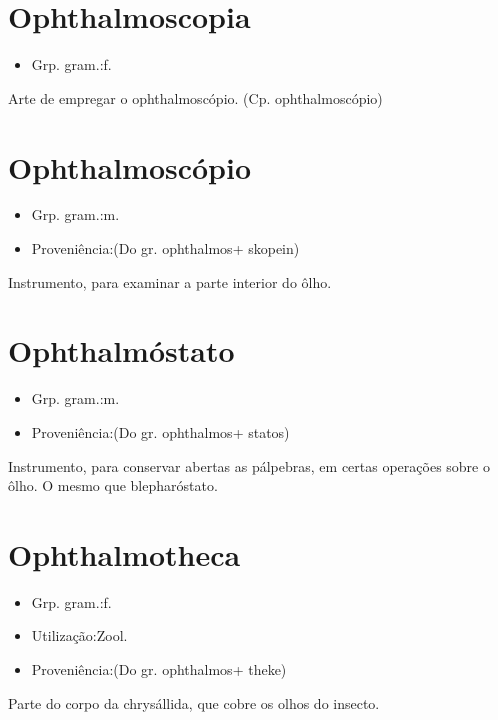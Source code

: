 \section{Ophthalmoscopia}
\begin{itemize}
\item {Grp. gram.:f.}
\end{itemize}
Arte de empregar o ophthalmoscópio.
(Cp. \textunderscore ophthalmoscópio\textunderscore )
\section{Ophthalmoscópio}
\begin{itemize}
\item {Grp. gram.:m.}
\end{itemize}
\begin{itemize}
\item {Proveniência:(Do gr. \textunderscore ophthalmos\textunderscore  + \textunderscore skopein\textunderscore )}
\end{itemize}
Instrumento, para examinar a parte interior do ôlho.
\section{Ophthalmóstato}
\begin{itemize}
\item {Grp. gram.:m.}
\end{itemize}
\begin{itemize}
\item {Proveniência:(Do gr. \textunderscore ophthalmos\textunderscore  + \textunderscore statos\textunderscore )}
\end{itemize}
Instrumento, para conservar abertas as pálpebras, em certas operações sobre o ôlho.
O mesmo que \textunderscore blepharóstato\textunderscore .
\section{Ophthalmotheca}
\begin{itemize}
\item {Grp. gram.:f.}
\end{itemize}
\begin{itemize}
\item {Utilização:Zool.}
\end{itemize}
\begin{itemize}
\item {Proveniência:(Do gr. \textunderscore ophthalmos\textunderscore  + \textunderscore theke\textunderscore )}
\end{itemize}
Parte do corpo da chrysállida, que cobre os olhos do insecto.
